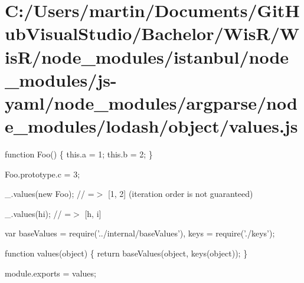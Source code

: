 \hypertarget{_c_1_2_users_2martin_2_documents_2_git_hub_visual_studio_2_bachelor_2_wis_r_2_wis_r_2node_moduled141d89d3d57ba8a79ede188f0c0e75a}{}\section{C\+:/\+Users/martin/\+Documents/\+Git\+Hub\+Visual\+Studio/\+Bachelor/\+Wis\+R/\+Wis\+R/node\+\_\+modules/istanbul/node\+\_\+modules/js-\/yaml/node\+\_\+modules/argparse/node\+\_\+modules/lodash/object/values.\+js}
function Foo() \{ this.\+a = 1; this.\+b = 2; \}

Foo.\+prototype.\+c = 3;

\+\_\+.\+values(new Foo); // =$>$ \mbox{[}1, 2\mbox{]} (iteration order is not guaranteed)

\+\_\+.\+values(\textquotesingle{}hi\textquotesingle{}); // =$>$ \mbox{[}\textquotesingle{}h\textquotesingle{}, \textquotesingle{}i\textquotesingle{}\mbox{]}


\begin{DoxyCodeInclude}
var baseValues = require(\textcolor{stringliteral}{'../internal/baseValues'}),
    keys = require(\textcolor{stringliteral}{'./keys'});

\textcolor{keyword}{function} values(\textcolor{keywordtype}{object}) \{
  \textcolor{keywordflow}{return} baseValues(\textcolor{keywordtype}{object}, keys(\textcolor{keywordtype}{object}));
\}

module.exports = values;
\end{DoxyCodeInclude}
 